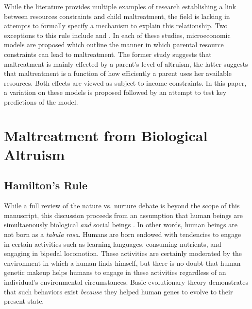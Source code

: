 While the literature provides multiple examples of research establishing a link between resources constraints and child maltreatment, the field is lacking in attempts to formally specify a mechanism to explain this relationship. Two exceptions to this rule include \citet{Brandon1999} and \citet{Brandon2001}. In each of these studies, microeconomic models are proposed which outline the manner in which parental resource constraints can lead to maltreatment. The former study suggests that maltreatment is mainly effected by a parent's level of altruism, the latter suggests that maltreatment is a function of how efficiently a parent uses her available resources. Both effects are viewed as subject to income constraints. In this paper, a variation on these models is proposed followed by an attempt to test key predictions of the model. 

\section{Maltreatment from Biological Altruism}
\label{bio_altruism}

\subsection{Hamilton's Rule}

While a full review of the nature vs. nurture debate is beyond the scope of this manuscript, this discussion proceeds from an assumption that human beings are simultaenously biological \emph{and} social beings \citep[see for example][]{Plomin1994, Ridley2003}. In other words, human beings are not born as a \emph{tabula rasa}. Humans are born endowed with tendencies to engage in certain activities such as learning languages, consuming nutrients, and engaging in bipedal locomotion. These activities are certainly moderated by the environment in which a human finds himself, but there is no doubt that human genetic makeup helps humans to engage in these activities regardless of an individual's environmental circumstances. Basic evolutionary theory demonstrates that such behaviors exist \emph{because} they helped human genes to evolve to their present state. 

